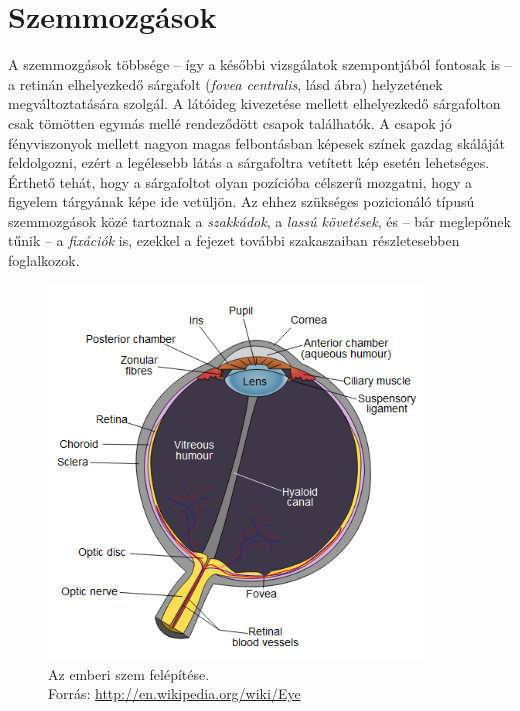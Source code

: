 \section{Szemmozgások}\label{sect:osztalyozas}


A szemmozgások többsége -- így a későbbi vizsgálatok szempontjából fontosak is -- a retinán elhelyezkedő sárgafolt (\emph{fovea centralis}, lásd  ábra) helyzetének megváltoztatására szolgál. A látóideg kivezetése mellett elhelyezkedő sárgafolton csak tömötten egymás mellé rendeződött csapok találhatók. A csapok jó fényviszonyok mellett nagyon magas felbontásban képesek színek gazdag skáláját feldolgozni, ezért a legélesebb látás a sárgafoltra vetített kép esetén lehetséges. Érthető tehát, hogy a sárgafoltot olyan pozícióba célszerű mozgatni, hogy a figyelem tárgyának képe ide vetüljön. Az ehhez szükséges pozicionáló típusú szemmozgások közé tartoznak a \emph{szakkádok}, a \emph{lassú követések}, és -- bár meglepőnek tűnik -- a \emph{fixációk} is, ezekkel a fejezet további szakaszaiban részletesebben foglalkozok.

\begin{figure}[!ht]
\centering
\includegraphics[width=100mm, keepaspectratio]{figures/eye_diagram.png}
\caption{Az emberi szem felépítése.\\Forrás: \url{http://en.wikipedia.org/wiki/Eye}}
\label{fig:eyediag}
\end{figure}

